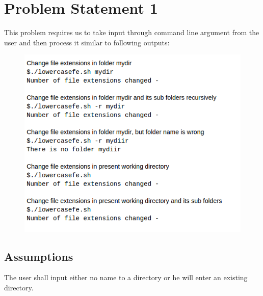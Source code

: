\documentclass[11pt]{report}
\begin{document}
\section{Problem Statement 1}
	This problem requires us to take input through command line argument from the user and then process it similar to following outputs:\\
	\begin{figure}[h!]
	\centering
	\includegraphics[scale=0.7]{images/Selection_003}	
	\end{figure}
	\subsection{Assumptions}
	The user shall input either no name to a directory or he will enter an existing directory.
	\pagebreak
\end{document}
